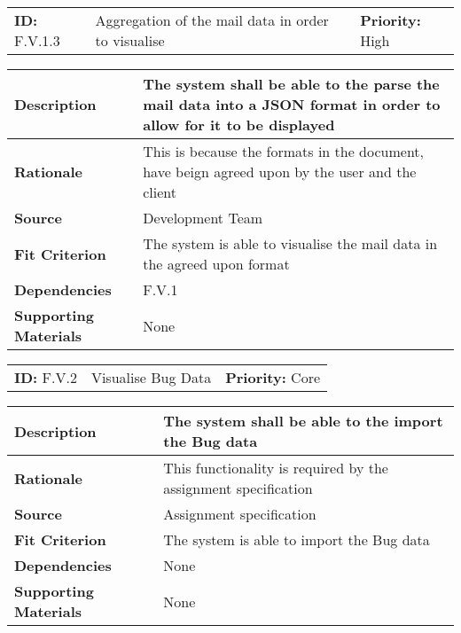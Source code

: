 \begin{table}[H]
    \begin{tabularx}{\textwidth}{| l | X | l |}
        \hline
        \textbf{ID:} F.V.1.3 & Aggregation of the mail data in order to visualise & \textbf{Priority:} High \\
    \end{tabularx}
    \begin{tabularx}{\textwidth}{| l | X |}
        \hline
        \textbf{Description} & The system shall be able to the parse the mail data into a JSON format in order to allow for it to be displayed\\ \hline
        \textbf{Rationale} & This is because the formats in the document, have beign agreed upon by the user and the client\\ \hline
        \textbf{Source} & Development Team\\ \hline
        \textbf{Fit Criterion} & The system is able to visualise the mail data in the agreed upon format\\ \hline
        \textbf{Dependencies} & F.V.1 \\ \hline
        \textbf{Supporting Materials} & None \\ \hline
    \end{tabularx}
\end{table}

\begin{table}[H]
    \begin{tabularx}{\textwidth}{| l | X | l |}
        \hline
        \textbf{ID:} F.V.2 & Visualise Bug Data & \textbf{Priority:} Core \\
    \end{tabularx}
    \begin{tabularx}{\textwidth}{| l | X |}
        \hline
        \textbf{Description} & The system shall be able to the import the Bug data \\ \hline
        \textbf{Rationale} & This functionality is required by the assignment specification\\ \hline
        \textbf{Source} & Assignment specification\\ \hline
        \textbf{Fit Criterion} & The system is able to import the Bug data\\ \hline
        \textbf{Dependencies} & None \\ \hline
        \textbf{Supporting Materials} & None \\ \hline
    \end{tabularx}
\end{table}

